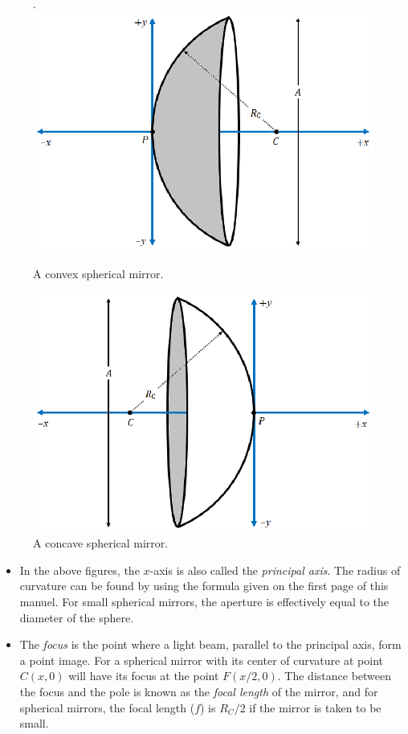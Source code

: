\documentclass{scrartcl}
\begin{document}
    \begin{figure}[H]
        \centering
        \begin{minipage}[b]{0.49\textwidth}.
        \includegraphics[width=\textwidth]{convexmirror.eps}
        \caption{A convex spherical mirror.}
        \end{minipage}
        \hfill
        \begin{minipage}[b]{0.49\textwidth}
            \includegraphics[width=\textwidth]{concavemirror.eps}
            \caption{A concave spherical mirror.}
        \end{minipage}
    \end{figure}
    \begin{itemize}
        \item In the above figures, the $x$-axis is also called the \textit{principal axis}. The radius of curvature can be found by using the formula given on the first page of this manuel. For small spherical mirrors, the aperture is effectively equal to the diameter of the sphere.
        \item The \textit{focus} is the point where a light beam, parallel to the principal axis, form a point image. For a spherical mirror with its center of curvature at point $C(x,0)$ will have its focus at the point $F(x/2,0)$. The distance between the focus and the pole is known as the \textit{focal length} of the mirror, and for spherical mirrors, the focal length ($f$) is $\boxed{R_C/2}$ if the mirror is taken to be small.
    \end{itemize}
\end{document}
